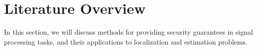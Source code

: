 \documentclass[10pt,letterpaper,oneside,twocolumn,journal]{IEEEtran}
\theoremstyle{definition}
\theoremstyle{definition}
\theoremstyle{remark}
\begin{document}
% 
%                              
%                              
%                              
% 

\section{Literature Overview} \label{sec:lit_overview}
In this section, we will discuss methods for providing security guarantees in signal processing tasks, and their applications to localization and estimation problems.

% 
% 
\end{document}
